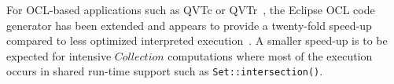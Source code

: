 \documentclass{llncs}
\begin{document}
For OCL-based applications such as QVTc or QVTr~\cite{QVT-1.3}, the Eclipse OCL code generator has been extended and appears to provide a twenty-fold speed-up compared to less optimized interpreted execution~\cite{Willink-EXE2016}. A smaller speed-up is to be expected for intensive $Collection$ computations where most of the execution occurs in shared run-time support such as \verb$Set::intersection()$.


 


 


\end{document}
